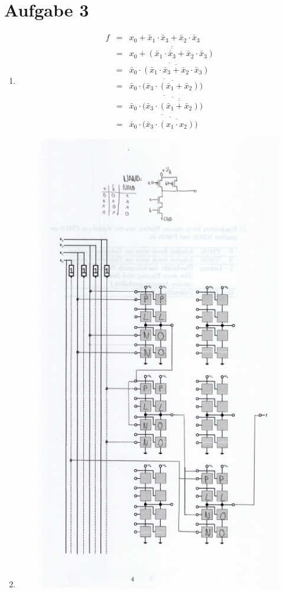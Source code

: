 \documentclass[a4paper]{article}
\begin{document}
\section*{Aufgabe 3}
\begin{enumerate}[label=\alph*)]
	\item 
	\begin{align*}
		f &= &x_0 + \bar{x}_1\cdot\bar{x}_3 + \bar{x}_2 \cdot \bar{x}_3 \\
		&= &\overline{\overline{x_0 + (\bar{x}_1\cdot\bar{x}_3 + \bar{x}_2 \cdot \bar{x}_3)}} \\
		&= &\overline{\bar{x}_0 \cdot \overline{(\bar{x}_1\cdot\bar{x}_3 + \bar{x}_2 \cdot \bar{x}_3)}} \\
		&= &\overline{\bar{x}_0 \cdot (\overline{\bar{x}_3 \cdot (\bar{x}_1 + \bar{x}_2)}}) \\
		&= &\overline{\bar{x}_0 \cdot (\overline{\bar{x}_3 \cdot \overline{\overline{(\bar{x}_1 + \bar{x}_2)}}}}) \\
		&= &\overline{\bar{x}_0 \cdot (\overline{\bar{x}_3 \cdot \overline{(x_1 \cdot x_2)}}})
	\end{align*}
	\item \begin{figure}[h!]
		\begin{center}
			\includegraphics[scale=0.8]{Aufgabe3b.png}

\end{center}
\end{figure}
\end{enumerate}
\end{document}
